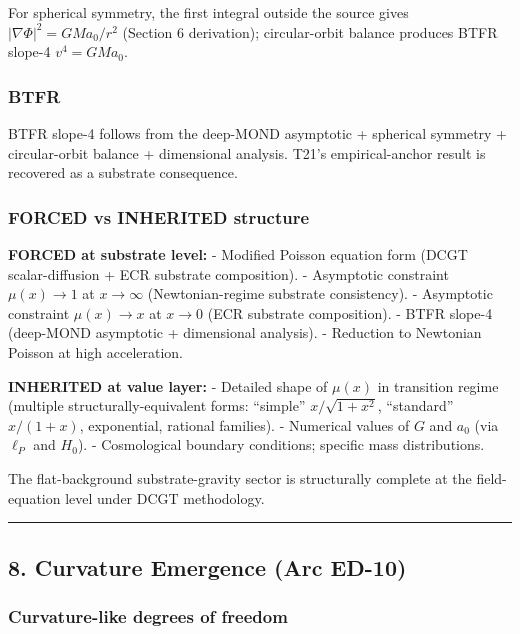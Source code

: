 \documentclass[
]{article}
\begin{document}
For spherical symmetry, the first integral outside the source gives
\(|\nabla\Phi|^2 = GMa_0/r^2\) (Section 6 derivation); circular-orbit
balance produces BTFR slope-4 \(v^4 = GMa_0\).

\subsubsection{BTFR}\label{btfr}

BTFR slope-4 follows from the deep-MOND asymptotic + spherical symmetry
+ circular-orbit balance + dimensional analysis. T21's empirical-anchor
result is recovered as a substrate consequence.

\subsubsection{FORCED vs INHERITED
structure}\label{forced-vs-inherited-structure}

\textbf{FORCED at substrate level:} - Modified Poisson equation form
(DCGT scalar-diffusion + ECR substrate composition). - Asymptotic
constraint \(\mu(x) \to 1\) at \(x \to \infty\) (Newtonian-regime
substrate consistency). - Asymptotic constraint \(\mu(x) \to x\) at
\(x \to 0\) (ECR substrate composition). - BTFR slope-4 (deep-MOND
asymptotic + dimensional analysis). - Reduction to Newtonian Poisson at
high acceleration.

\textbf{INHERITED at value layer:} - Detailed shape of \(\mu(x)\) in
transition regime (multiple structurally-equivalent forms: ``simple''
\(x/\sqrt{1+x^2}\), ``standard'' \(x/(1+x)\), exponential, rational
families). - Numerical values of \(G\) and \(a_0\) (via \(\ell_P\) and
\(H_0\)). - Cosmological boundary conditions; specific mass
distributions.

The flat-background substrate-gravity sector is structurally complete at
the field-equation level under DCGT methodology.

\begin{center}\rule{0.5\linewidth}{0.5pt}\end{center}

\subsection{8. Curvature Emergence (Arc
ED-10)}\label{curvature-emergence-arc-ed-10}

\subsubsection{Curvature-like degrees of
freedom}\label{curvature-like-degrees-of-freedom}
\end{document}
